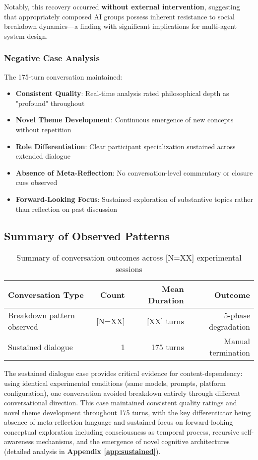 \documentclass[11pt,letterpaper]{article}
\newcommand{\totalSessions}{[N=XX]} %
\newcommand{\breakdownSessions}{[N=XX]} %
\newcommand{\meanBreakdownTurn}{[XX]} %
\newcommand{\negativeCase}{175} %
\begin{document}
Notably, this recovery occurred \textbf{without external intervention}, suggesting that appropriately composed AI groups possess inherent resistance to social breakdown dynamics—a finding with significant implications for multi-agent system design.

\subsubsection{Negative Case Analysis}

The \negativeCase{}-turn conversation maintained:
\begin{itemize}
    \item \textbf{Consistent Quality}: Real-time analysis rated philosophical depth as "profound" throughout
    \item \textbf{Novel Theme Development}: Continuous emergence of new concepts without repetition
    \item \textbf{Role Differentiation}: Clear participant specialization sustained across extended dialogue
    \item \textbf{Absence of Meta-Reflection}: No conversation-level commentary or closure cues observed
    \item \textbf{Forward-Looking Focus}: Sustained exploration of substantive topics rather than reflection on past discussion
\end{itemize}

\subsection{Summary of Observed Patterns}

\begin{table}[h]
\centering
\begin{tabular}{lrrr}
\toprule
\textbf{Conversation Type} & \textbf{Count} & \textbf{Mean Duration} & \textbf{Outcome} \\
\midrule
Breakdown pattern observed & \breakdownSessions{} & \meanBreakdownTurn{} turns & 5-phase degradation \\
Sustained dialogue & 1 & \negativeCase{} turns & Manual termination \\
\bottomrule
\end{tabular}
\caption{Summary of conversation outcomes across \totalSessions{} experimental sessions}
\label{tab:conversation_outcomes}
\end{table}

The sustained dialogue case provides critical evidence for content-dependency: using identical experimental conditions (same models, prompts, platform configuration), one conversation avoided breakdown entirely through different conversational direction. This case maintained consistent quality ratings and novel theme development throughout \negativeCase{} turns, with the key differentiator being absence of meta-reflection language and sustained focus on forward-looking conceptual exploration including consciousness as temporal process, recursive self-awareness mechanisms, and the emergence of novel cognitive architectures (detailed analysis in \textbf{Appendix \ref{app:sustained}}).
\end{document}
